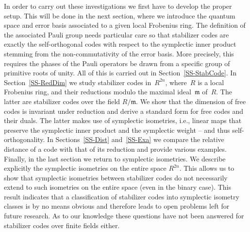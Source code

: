 \documentclass[11pt]{article}
\theoremstyle{definition}
\numberwithin{equation}{section}
\newcommand{\mm}{{\mathfrak m}}
\newcounter{rom}
\begin{document}
In order to carry out these investigations we first have to develop the proper setup. This will be done in the next section, where we introduce the quantum space and error
basis associated to a given local Frobenius ring.
The definition of the associated Pauli group needs particular care so that stabilizer codes are exactly the self-orthogonal codes with respect to the symplectic inner
product stemming from the non-commutativity of the error basis.
More precisely, this requires the phases of the Pauli operators be drawn from a specific group of primitive roots of unity.
All of this is carried out in Section~\ref{SS-StabCode}.
In Section~\ref{SS-RedDim} we study stabilizer codes in~$R^{2n}$, where~$R$ is a local Frobenius ring, and their reductions modulo the maximal ideal~$\mm$ of~$R$.
The latter are stabilizer codes over the field $R/\mm$.
We show that the dimension of free codes is invariant under reduction and derive a standard form for free codes and their duals.
The latter makes use of symplectic isometries, i.e., linear maps that preserve the symplectic inner product and the symplectic weight -- and thus self-orthogonality.
In Sections~\ref{SS-Dist} and~\ref{SS-Exa} we compare the relative distance of a code with that of its reduction and provide various examples.
Finally, in the last section we return to symplectic isometries.
We describe explicitly the symplectic isometries on the entire space $R^{2n}$.
This allows us to show that symplectic isometries between stabilizer codes do not necessarily extend to such isometries on the entire space (even in the binary case).
This result indicates that a classification of stabilizer codes into symplectic isometry classes is by no means obvious and therefore leads to open problems left for future research.
As to our knowledge these questions have not been answered for stabilizer codes over finite fields either.



\end{document}

